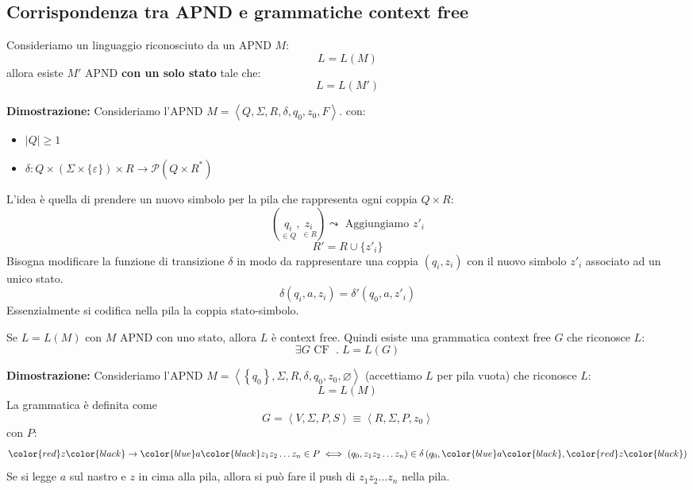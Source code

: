 \documentclass[a4paper]{article}
\begin{document}
\subsection{Corrispondenza tra APND e grammatiche context free}
\begin{theorem}
  Consideriamo un linguaggio riconosciuto da un APND \( M \):
  \[
    L = L(M)
  \] 
  allora esiste \( M' \) APND \textbf{con un solo stato} tale che:
  \[
    L = L(M')
  \] 

  \vspace{1em}
  \noindent
  \textbf{Dimostrazione:} Consideriamo l'APND \( M = \left< Q, \Sigma, R, \delta, q_0, z_0, F \right> \).
  con:
  \begin{itemize}
    \item 
      \( \left| Q \right| \ge 1 \) 
    \item \( \delta: Q \times \left( \Sigma \times \{\varepsilon \}  \right) \times R \to 
      \mathcal{P}\left( Q \times R^* \right) \) 
  \end{itemize}
  L'idea è quella di prendere un nuovo simbolo per la pila che rappresenta ogni coppia
  \( Q \times R \):
  \[
    \left( \underset{\in Q}{q_i}, \underset{\in R}{z_i} \right)
    \leadsto \text{ Aggiungiamo } z'_i
  \] 
  \[
    R' = R \cup \{z'_i\} 
  \] 
  Bisogna modificare la funzione di transizione \( \delta \) in modo da rappresentare
  una coppia \( (q_i, z_i) \) con il nuovo simbolo \( z'_i \) associato ad un unico stato.
  \[
    \delta(q_i, a, z_i) = \delta'(q_0, a, z'_i)
  \] 
  Essenzialmente si codifica nella pila la coppia stato-simbolo.
\end{theorem}

\begin{theorem}
  Se \( L = L(M) \) con \( M \) APND con uno stato, allora \( L \) è context free.
  Quindi esiste una grammatica context free \( G \) che riconosce \( L \):
  \[
    \exists G \text{ CF } \;.\; L = L(G)
  \] 

  \vspace{1em}
  \noindent
  \textbf{Dimostrazione:} Consideriamo l'APND
  \( M = \left< \left\{ q_0 \right\}, \Sigma, R, \delta, q_0, z_0, \varnothing \right> \)
  (accettiamo \( L \) per pila vuota) che riconosce \( L \):
  \[
    L = L(M)
  \] 
  La grammatica è definita come \[ G = \left< V, \Sigma, P, S \right> \equiv
  \left< R, \Sigma, P, z_0 \right> \]
  con \( P \):
  \[
    \color{red}z\color{black} \to \color{blue}a\color{black} z_1 z_2 \ldots z_n \in P \iff \left( q_0, z_1 z_2 \ldots z_n \right) 
    \in \delta \left( q_0, \color{blue}a\color{black}, \color{red}z\color{black} \right) 
  \] 
  Se si legge \( a \) sul nastro e \( z \) in cima alla pila, allora si può fare
  il push di \( z_1 z_2 \ldots z_n \) nella pila.
\end{theorem}
\end{document}
